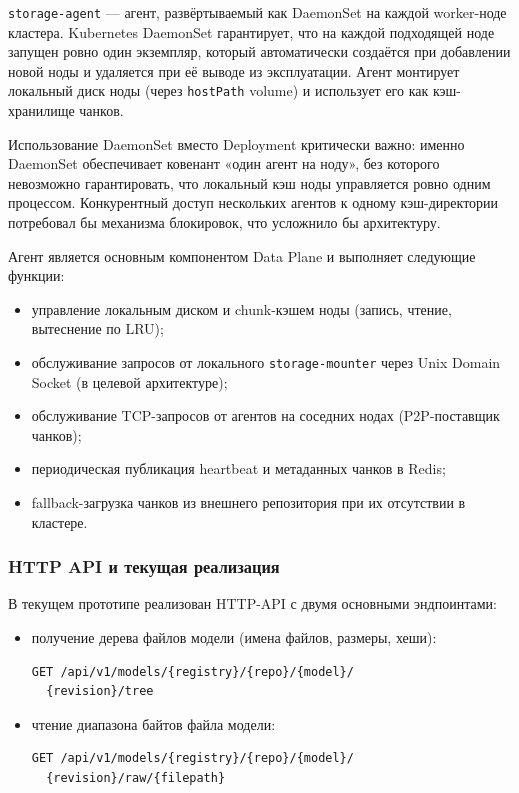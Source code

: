 \texttt{storage-agent} --- агент, развёртываемый как DaemonSet на каждой worker-ноде кластера. Kubernetes DaemonSet гарантирует, что на каждой подходящей ноде запущен ровно один экземпляр, который автоматически создаётся при добавлении новой ноды и удаляется при её выводе из эксплуатации. Агент монтирует локальный диск ноды (через \texttt{hostPath} volume) и использует его как кэш-хранилище чанков.

Использование DaemonSet вместо Deployment критически важно: именно DaemonSet обеспечивает ковенант «один агент на ноду», без которого невозможно гарантировать, что локальный кэш ноды управляется ровно одним процессом. Конкурентный доступ нескольких агентов к одному кэш-директории потребовал бы механизма блокировок, что усложнило бы архитектуру.

Агент является основным компонентом Data Plane и выполняет следующие функции:

\begin{itemize}[leftmargin=*]
  \item управление локальным диском и chunk-кэшем ноды (запись, чтение, вытеснение по LRU);
  \item обслуживание запросов от локального \texttt{storage-mounter} через Unix Domain Socket (в целевой архитектуре);
  \item обслуживание TCP-запросов от агентов на соседних нодах (P2P-поставщик чанков);
  \item периодическая публикация heartbeat и метаданных чанков в Redis;
  \item fallback-загрузка чанков из внешнего репозитория при их отсутствии в кластере.
\end{itemize}

\subsubsection{HTTP API и текущая реализация}

В текущем прототипе реализован HTTP-API с двумя основными эндпоинтами:

\begin{itemize}[leftmargin=*]
  \item получение дерева файлов модели (имена файлов, размеры, хеши):
\begin{lstlisting}[numbers=none,frame=none,basicstyle=\footnotesize\ttfamily,aboveskip=0pt,belowskip=0pt]
GET /api/v1/models/{registry}/{repo}/{model}/
  {revision}/tree
\end{lstlisting}
  \item чтение диапазона байтов файла модели:
\begin{lstlisting}[numbers=none,frame=none,basicstyle=\footnotesize\ttfamily,aboveskip=0pt,belowskip=0pt]
GET /api/v1/models/{registry}/{repo}/{model}/
  {revision}/raw/{filepath}
\end{lstlisting}
\end{itemize}

